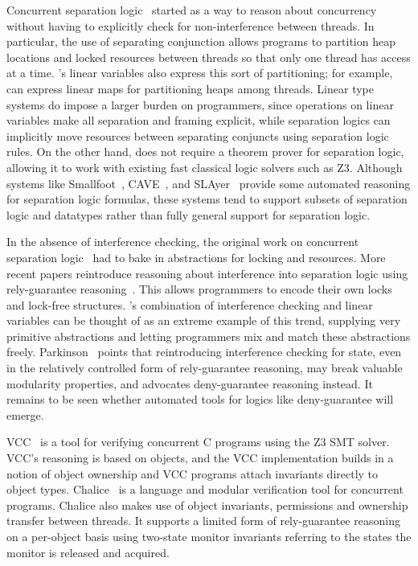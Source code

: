 Concurrent separation logic~\cite{OHearn07} started as a way to reason about concurrency without having to explicitly check for non-interference between threads.
In particular, the use of separating conjunction allows programs to partition heap locations and locked resources between threads so that only one thread has access at a time.
\civl's linear variables also express this sort of partitioning; for example, \civl can express linear maps for partitioning heaps among threads.
Linear type systems do impose a larger burden on programmers, since operations on linear variables make all separation and framing explicit, while separation logics can implicitly move resources between separating conjuncts using separation logic rules.
On the other hand, \civl does not require a theorem prover for separation logic, allowing it to work with existing fast classical logic solvers such as Z3.
Although systems like Smallfoot~\cite{Smallfoot}, CAVE~\cite{Cave}, and SLAyer~\cite{Slayer} provide some automated reasoning for separation logic formulas, these systems tend to support subsets of separation logic and datatypes rather than fully general support for separation logic.

In the absence of interference checking, the original work on concurrent separation logic~\cite{OHearn07} had to bake in abstractions for locking and resources.
More recent papers reintroduce reasoning about interference into separation logic using rely-guarantee reasoning~\cite{SAGL,RGSep}.
This allows programmers to encode their own locks and lock-free structures.
\civl's combination of interference checking and linear variables can be thought of as an extreme example of this trend, supplying very primitive abstractions and letting programmers mix and match these abstractions freely.
Parkinson~\cite{SepLog700} points that reintroducing interference checking for state, even in the relatively controlled form of rely-guarantee reasoning, may break valuable modularity properties, and advocates deny-guarantee reasoning instead.
It remains to be seen whether automated tools for logics like deny-guarantee will emerge.

VCC~\cite{VCC} is a tool for verifying concurrent C programs using the Z3 SMT solver.  VCC's reasoning is based on objects, and the VCC implementation builds in a notion of object ownership and VCC programs attach invariants directly to object types.  Chalice~\cite{LM09} is a language and modular verification tool for concurrent programs. Chalice also makes use of  object invariants, permissions and ownership transfer between threads. It supports a limited form of rely-guarantee reasoning on a per-object basis using two-state monitor invariants referring to the states the monitor is released and acquired. 

